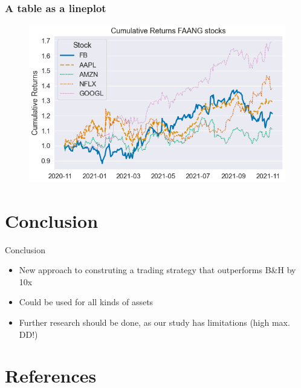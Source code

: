 \documentclass{beamer}
\begin{document}
\begin{frame}
  \frametitle{A table as a lineplot}
  \begin{figure}[H]
    \centering
    \includegraphics[width=\linewidth]{lineplot_beamer}
  \end{figure}        
\end{frame}

\section{Conclusion}
\begin{frame}{Conclusion}
  \begin{itemize}
    \item New approach to construting a trading strategy that outperforms B\&H by 10x
    \item Could be used for all kinds of assets
    \item Further research should be done, as our study has limitations (high max. DD!)
  \end{itemize}
\end{frame}
\section*{References}
\end{document}
